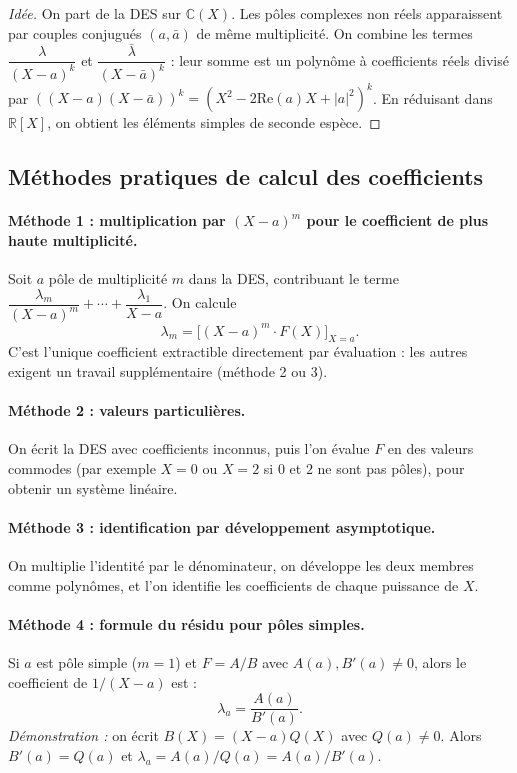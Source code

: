 \begin{proof}[Idée]
On part de la DES sur $\mathbb{C}(X)$. Les pôles complexes non réels apparaissent par couples conjugués $(a, \bar{a})$ de même multiplicité. On combine les termes $\dfrac{\lambda}{(X - a)^k}$ et $\dfrac{\bar{\lambda}}{(X - \bar{a})^k}$ : leur somme est un polynôme à coefficients réels divisé par $((X - a)(X - \bar{a}))^k = (X^2 - 2 \mathrm{Re}(a) X + |a|^2)^k$. En réduisant dans $\mathbb{R}[X]$, on obtient les éléments simples de seconde espèce.
\end{proof}

\subsection{Méthodes pratiques de calcul des coefficients}

\paragraph{Méthode 1 : multiplication par $(X - a)^m$ pour le coefficient de plus haute multiplicité.}
Soit $a$ pôle de multiplicité $m$ dans la DES, contribuant le terme $\dfrac{\lambda_m}{(X - a)^m} + \cdots + \dfrac{\lambda_1}{X - a}$.
On calcule
\[ \lambda_m = \big[(X - a)^m \cdot F(X)\big]_{X = a}. \]
C'est l'unique coefficient extractible directement par évaluation : les autres exigent un travail supplémentaire (méthode 2 ou 3).

\paragraph{Méthode 2 : valeurs particulières.}
On écrit la DES avec coefficients inconnus, puis l'on évalue $F$ en des valeurs commodes (par exemple $X = 0$ ou $X = 2$ si $0$ et $2$ ne sont pas pôles), pour obtenir un système linéaire.

\paragraph{Méthode 3 : identification par développement asymptotique.}
On multiplie l'identité par le dénominateur, on développe les deux membres comme polynômes, et l'on identifie les coefficients de chaque puissance de $X$.

\paragraph{Méthode 4 : formule du résidu pour pôles simples.}
Si $a$ est pôle simple ($m = 1$) et $F = A/B$ avec $A(a), B'(a) \neq 0$, alors le coefficient de $1/(X - a)$ est :
\[ \lambda_a = \frac{A(a)}{B'(a)}. \]
\textit{Démonstration :} on écrit $B(X) = (X - a) Q(X)$ avec $Q(a) \neq 0$. Alors $B'(a) = Q(a)$ et $\lambda_a = A(a)/Q(a) = A(a)/B'(a)$.

